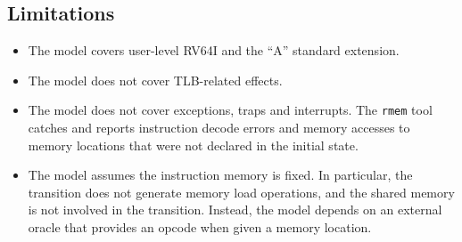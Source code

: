 \subsection{Limitations}\label{sec:omm:limitations}
\begin{itemize}
\item The model covers user-level RV64I and the ``A'' standard extension.
\item The model does not cover TLB-related effects.
\item The model does not cover exceptions, traps and interrupts.
The {\tt rmem} tool catches and reports instruction decode errors and memory accesses to memory locations that were not declared in the initial state.
\item The model assumes the instruction memory is fixed.
In particular, the  transition does not generate memory load operations, and the shared memory is not involved in the transition.
Instead, the model depends on an external oracle that provides an opcode when given a memory location.
\end{itemize}

